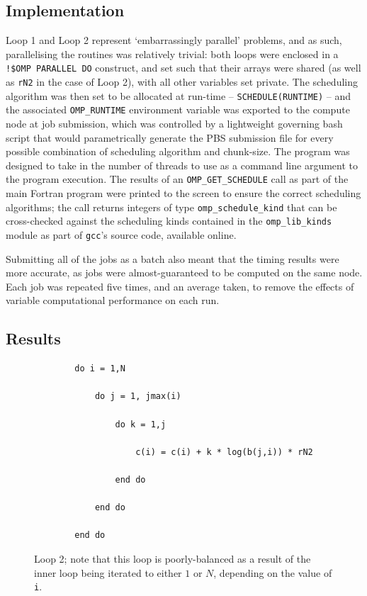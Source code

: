 \documentclass{article} %
\newcommand{\tp}{\texttt}
\begin{document}
\subsection*{Implementation}

Loop 1 and Loop 2 represent `embarrassingly parallel' problems, and as such, parallelising the routines was relatively trivial: both loops were enclosed in a \tp{!\$OMP PARALLEL DO} construct, and set such that their arrays were shared (as well as \tp{rN2} in the case of Loop 2), with all other variables set private.
The scheduling algorithm was then set to be allocated at run-time -- \tp{SCHEDULE(RUNTIME)} -- and the associated \tp{OMP\_RUNTIME} environment variable was exported to the compute node at job submission, which was controlled by a lightweight governing bash script that would parametrically generate the PBS submission file for every possible combination of scheduling algorithm and chunk-size.
The program was designed to take in the number of threads to use as a command line argument to the program execution.
The results of an \tp{OMP\_GET\_SCHEDULE} call as part of the main Fortran program were printed to the screen to ensure the correct scheduling algorithms; the call returns integers of type \tp{omp\_schedule\_kind} that can be cross-checked against the scheduling kinds contained in the \tp{omp\_lib\_kinds} module as part of \tp{gcc}'s source code, available online.

Submitting all of the jobs as a batch also meant that the timing results were more accurate, as jobs were almost-guaranteed to be computed on the same node.
Each job was repeated five times, and an average taken, to remove the effects of variable computational performance on each run.

\subsection*{Results}



\begin{figure}
    \begin{lstlisting}
        do i = 1,N

            do j = 1, jmax(i) 
        
                do k = 1,j 
                    
                    c(i) = c(i) + k * log(b(j,i)) * rN2
                
                end do
            
            end do
     
        end do
    \end{lstlisting}
    \caption{Loop 2; note that this loop is poorly-balanced as a result of the inner loop being iterated to either $1$ or $N$, depending on the value of \texttt{i}.}
    \label{listing:loop2}
\end{figure}
\end{document}
